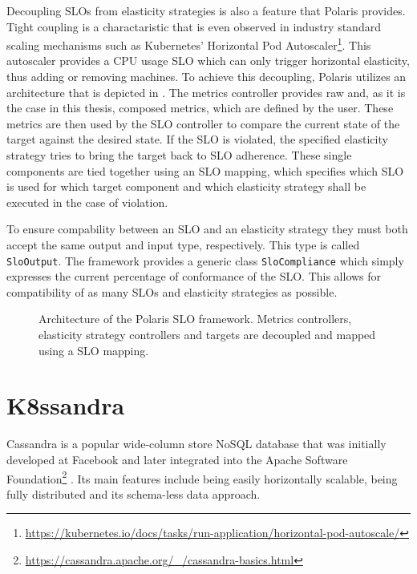 Decoupling SLOs from elasticity strategies is also a feature that Polaris provides. Tight coupling is a charactaristic that is even observed in industry standard scaling mechanisms such as Kubernetes' Horizontal Pod Autoscaler\footnote{\raggedright\url{https://kubernetes.io/docs/tasks/run-application/horizontal-pod-autoscale/}}. This autoscaler provides a CPU usage SLO which can only trigger horizontal elasticity, thus adding or removing machines. To achieve this decoupling, Polaris utilizes an architecture that is depicted in . The metrics controller provides raw and, as it is the case in this thesis, composed metrics, which are defined by the user. These metrics are then used by the SLO controller to compare the current state of the target against the desired state. If the SLO is violated, the specified elasticity strategy tries to bring the target back to SLO adherence. These single components are tied together using an SLO mapping, which specifies which SLO is used for which target component and which elasticity strategy shall be executed in the case of violation. 

To ensure compability between an SLO and an elasticity strategy they must both accept the same output and input type, respectively. This type is called \texttt{SloOutput}. The framework provides a generic class \texttt{SloCompliance} which simply expresses the current percentage of conformance of the SLO. This allows for compatibility of as many SLOs and elasticity strategies as possible.

\begin{figure}
    \centering
    \caption{Architecture of the Polaris SLO framework. Metrics controllers, elasticity strategy controllers and targets are decoupled and mapped using a SLO mapping.}
    \label{fig:polaris-architecture}
\end{figure}

\section{K8ssandra}
\label{sec:k8ssandra}

Cassandra is a popular wide-column store NoSQL database that was initially developed at Facebook and later integrated into the Apache Software Foundation\footnote{\url{https://cassandra.apache.org/_/cassandra-basics.html}\label{fn:cassandra-basics}} \cite{lakshmanCassandraDecentralizedStructured2010}. Its main features include being easily horizontally scalable, being fully distributed and its schema-less data approach.

